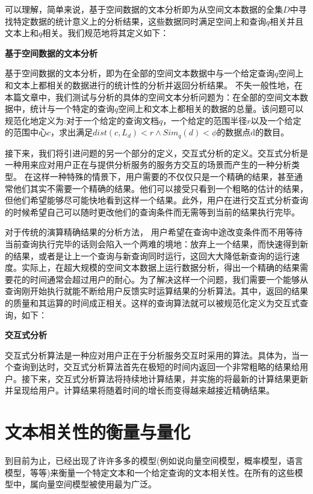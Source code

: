可以理解，简单来说，基于空间数据的文本分析即为从空间文本数据的全集$D$中寻找特定数据的统计意义上的分析结果，这些数据同时满足空间上和查询$q$相关并且文本上和$q$相关。我们规范地将其定义如下：

\begin{definition}
	{\bf 基于空间数据的文本分析}
	
	基于空间数据的文本分析，即为在全部的空间文本数据中与一个给定查询$q$空间上和文本上都相关的数据进行的统计性的分析并返回分析结果。 不失一般性地，在本篇文章中，我们测试与分析的具体的空间文本分析问题为：在全部的空间文本数据中，统计与一个特定的查询$q$空间上和文本上都相关的数据的总量。该问题可以规范化地定义为:对于一个给定的查询文档$ q $，一个给定的范围半径$ r $以及一个给定的范围中心$ c $，求出满足$ dist(c,L_d) < r \land Sim_q(d) < \phi $的数据点d的数目。
\end{definition}


接下来，我们将引进问题的另一个部分的定义，交互式分析的定义。交互式分析是一种用来应对用户正在与提供分析服务的服务方交互的场景而产生的一种分析类型。 在这样一种特殊的情景下，用户需要的不仅仅只是一个精确的结果，甚至通常他们其实不需要一个精确的结果。他们可以接受只看到一个粗略的估计的结果，但他们希望能够尽可能快地看到这样一个结果。此外，用户在进行交互式分析查询的时候希望自己可以随时更改他们的查询条件而无需等到当前的结果执行完毕。

对于传统的演算精确结果的分析方法， 用户希望在查询中途改变条件而不用等待当前查询执行完毕的话则会陷入一个两难的境地：放弃上一个结果，而快速得到新的结果，或者是让上一个查询与新查询同时运行，这回大大降低新查询的运行速度。实际上，在超大规模的空间文本数据上运行数据分析，得出一个精确的结果需要花的时间通常会超过用户的耐心。为了解决这样一个问题，我们需要一个能够从查询刚开始执行就能不断给用户反馈实时运算结果的分析算法。其中，返回的结果的质量和其运算的时间成正相关。这样的查询算法就可以被规范化定义为交互式查询，如下：

\begin{definition}
	{\bf 交互式分析}
	
交互式分析算法是一种应对用户正在于分析服务交互时采用的算法。具体为，当一个查询到达时，交互式分析算法首先在极短的时间内返回一个非常粗略的结果给用户。接下来，交互式分析算法将持续地计算结果，并实施的将最新的计算结果更新并呈现给用户。计算结果将随着时间的增长而变得越来越接近精确结果。

\end{definition}


\section{文本相关性的衡量与量化}
\label{sec:other}
到目前为止，已经出现了许许多多的模型(例如说向量空间模型，概率模型，语言模型，等等)来衡量一个特定文本和一个给定查询的文本相关性。在所有的这些模型中，属向量空间模型被使用最为广泛。

